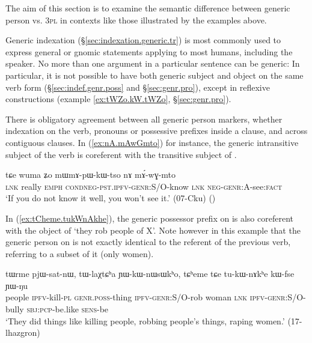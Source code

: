 The aim of this section is to examine the semantic difference between generic person vs. \textsc{3pl} in contexts like those illustrated by the examples above.

Generic indexation (§\ref{sec:indexation.generic.tr}) is most commonly used to express general or gnomic statements applying to most humans, including the speaker. No more than one argument in a particular sentence can be generic: In particular, it is not possible to have both generic subject and object on the same verb form (§\ref{sec:indef.genr.poss} and §\ref{sec:genr.pro}), except in reflexive constructions (example \ref{ex:tWZo.kW.tWZo}, §\ref{sec:genr.pro}). 

There is obligatory agreement between all generic person markers, whether indexation on the verb, pronouns or possessive prefixes inside a clause, and across contiguous clauses. In (\ref{ex:nA.mAwGmto}) for instance, the generic intransitive subject of the verb  is coreferent with the transitive subject of .

\begin{exe}
\ex   \label{ex:nA.mAwGmto}
 \gll   tɕe wuma ʑo mɯ\redp{}mɤ-pɯ-kɯ-tso nɤ mɤ́-wɣ-mto \\
 \textsc{lnk} really \textsc{emph} \textsc{cond}\redp{}\textsc{neg}-\textsc{pst}.\textsc{ipfv}-\textsc{genr}:S/O-know \textsc{lnk} \textsc{neg}-\textsc{genr}:\textsc{A}-see:\textsc{fact} \\
\glt `If you do not know it well, you won't see it.'   (07-Cku) ()
\end{exe}

In (\ref{ex:tCheme.tukWnAkhe}), the generic possessor prefix on  is also coreferent with the object of  `they rob people of X'. Note however in this example that the generic person on  is not exactly identical to the referent of the previous verb, referring to a subset of it (only women).

\begin{exe}
\ex   \label{ex:tCheme.tukWnAkhe}
 \gll  tɯrme pjɯ-sat-nɯ, tɯ-laχtɕʰa ɲɯ-kɯ-nɯsɯkʰo, tɕʰeme tɕe tu-kɯ-nɤkʰe kɯ-fse ɲɯ-ŋu \\
 people \textsc{ipfv}-kill-\textsc{pl} \textsc{genr}.\textsc{poss}-thing \textsc{ipfv}-\textsc{genr}:S/O-rob woman \textsc{lnk} \textsc{ipfv}-\textsc{genr}:S/O-bully \textsc{sbj}:\textsc{pcp}-be.like \textsc{sens}-be \\
 \glt `They did things like killing people, robbing people's things, raping women.' (17-lhazgron)
\end{exe}

